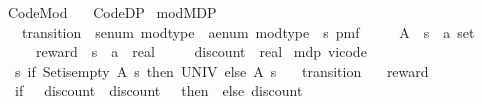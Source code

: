 %
\begin{isabellebody}%
%
%
\isadelimtheory
%
\endisadelimtheory
%
\isatagtheory
{}\isamarkupfalse%
\ Code{\isacharunderscore}{\kern0pt}Mod\isanewline
\ \ \ Code{\isacharunderscore}{\kern0pt}DP\isanewline
{}%
\endisatagtheory
{\isafoldtheory}%
%
\isadelimtheory
%
\endisadelimtheory
%
\isadelimdocument
%
\endisadelimdocument
%
\isatagdocument
%
\isamarkuptrue%
%
\endisatagdocument
{\isafolddocument}%
%
\isadelimdocument
%
\endisadelimdocument
{}\isamarkupfalse%
\ mod{\isacharunderscore}{\kern0pt}MDP\ {\isacharequal}{\kern0pt}\isanewline
\ \ \ transition\ {\isacharcolon}{\kern0pt}{\isacharcolon}{\kern0pt}\ {\isachardoublequoteopen}{\isacharprime}{\kern0pt}s{\isacharcolon}{\kern0pt}{\isacharcolon}{\kern0pt}{\isacharbraceleft}{\kern0pt}enum{\isacharcomma}{\kern0pt}\ mod{\isacharunderscore}{\kern0pt}type{\isacharbraceright}{\kern0pt}\ {\isasymtimes}\ {\isacharprime}{\kern0pt}a{\isacharcolon}{\kern0pt}{\isacharcolon}{\kern0pt}{\isacharbraceleft}{\kern0pt}enum{\isacharcomma}{\kern0pt}\ mod{\isacharunderscore}{\kern0pt}type{\isacharbraceright}{\kern0pt}\ {\isasymRightarrow}\ {\isacharprime}{\kern0pt}s\ pmf{\isachardoublequoteclose}\isanewline
\ \ \ \ \ A\ {\isacharcolon}{\kern0pt}{\isacharcolon}{\kern0pt}\ {\isachardoublequoteopen}{\isacharprime}{\kern0pt}s\ {\isasymRightarrow}\ {\isacharprime}{\kern0pt}a\ set{\isachardoublequoteclose}\isanewline
\ \ \ \ \ reward\ {\isacharcolon}{\kern0pt}{\isacharcolon}{\kern0pt}\ {\isachardoublequoteopen}{\isacharprime}{\kern0pt}s\ {\isasymtimes}\ {\isacharprime}{\kern0pt}a\ {\isasymRightarrow}\ real{\isachardoublequoteclose}\isanewline
\ \ \ \ \ discount\ {\isacharcolon}{\kern0pt}{\isacharcolon}{\kern0pt}\ {\isachardoublequoteopen}real{\isachardoublequoteclose}\isanewline
{}\isanewline
\isanewline
{}\isamarkupfalse%
\ mdp{\isacharcolon}{\kern0pt}\ vi{\isacharunderscore}{\kern0pt}code\ \isanewline
\ \ {\isachardoublequoteopen}{\isasymlambda}s{\isachardot}{\kern0pt}\ {\isacharparenleft}{\kern0pt}if\ Set{\isachardot}{\kern0pt}is{\isacharunderscore}{\kern0pt}empty\ {\isacharparenleft}{\kern0pt}A\ s{\isacharparenright}{\kern0pt}\ then\ UNIV\ else\ A\ s{\isacharparenright}{\kern0pt}{\isachardoublequoteclose}\ \isanewline
\ \ transition\ \isanewline
\ \ reward\isanewline
\ \ {\isachardoublequoteopen}{\isacharparenleft}{\kern0pt}if\ {}\ {\isasymle}\ discount\ {\isasymor}\ discount\ {\isacharless}{\kern0pt}\ {}\ then\ {}\ else\ discount{\isacharparenright}{\kern0pt}{\isachardoublequoteclose}\isanewline

\end{isabellebody}
